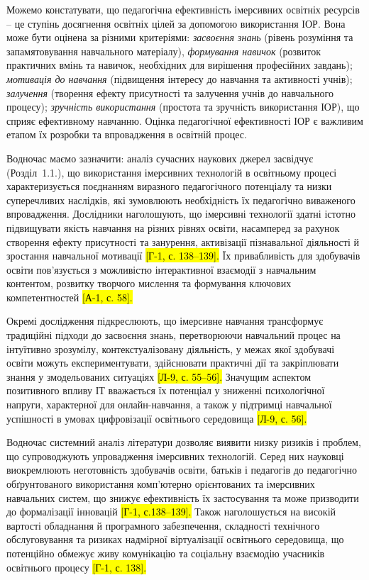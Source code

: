 Можемо констатувати, що педагогічна ефективність імерсивних освітніх ресурсів -- це ступінь досягнення освітніх цілей за допомогою використання ІОР. Вона може бути оцінена за різними критеріями: \emph{засвоєння знань} (рівень розуміння та запам\textquotesingle ятовування навчального матеріалу), \emph{формування навичок} (розвиток практичних вмінь та навичок, необхідних для вирішення професійних завдань); \emph{мотивація до навчання} (підвищення інтересу до навчання та активності учнів); \emph{залучення} (творення ефекту присутності та залучення учнів до навчального процесу); \emph{зручність використання} (простота та зручність використання ІОР), що сприяє ефективному навчанню. Оцінка педагогічної ефективності ІОР є важливим етапом їх розробки та впровадження в освітній процес.

Водночас маємо зазначити: аналіз сучасних наукових джерел засвідчує (Розділ~1.1.), що використання імерсивних технологій в освітньому процесі характеризується поєднанням виразного педагогічного потенціалу та низки суперечливих наслідків, які зумовлюють необхідність їх педагогічно виваженого впровадження. Дослідники наголошують, що імерсивні технології здатні істотно підвищувати якість навчання на різних рівнях освіти, насамперед за рахунок створення ефекту присутності та занурення, активізації пізнавальної діяльності й зростання навчальної мотивації \hl{{[}Г-1, с. 138--139{]}.} Їх привабливість для здобувачів освіти пов'язується з можливістю інтерактивної взаємодії з навчальним контентом, розвитку творчого мислення та формування ключових компетентностей \hl{{[}А-1, с. 58{]}.}

Окремі дослідження підкреслюють, що імерсивне навчання трансформує традиційні підходи до засвоєння знань, перетворюючи навчальний процес на інтуїтивно зрозумілу, контекстуалізовану діяльність, у межах якої здобувачі освіти можуть експериментувати, здійснювати практичні дії та закріплювати знання у змодельованих ситуаціях \hl{{[}Л-9, с. 55--56{]}.} Значущим аспектом позитивного впливу ІТ вважається їх потенціал у зниженні психологічної напруги, характерної для онлайн-навчання, а також у підтримці навчальної успішності в умовах цифровізації освітнього середовища \hl{{[}Л-9, с. 56{]}.}

Водночас системний аналіз літератури дозволяє виявити низку ризиків і проблем, що супроводжують упровадження імерсивних технологій. Серед них науковці виокремлюють неготовність здобувачів освіти, батьків і педагогів до педагогічно обґрунтованого використання комп'ютерно орієнтованих та імерсивних навчальних систем, що знижує ефективність їх застосування та може призводити до формалізації інновацій \hl{{[}Г-1, с.138--139{]}.} Також наголошується на високій вартості обладнання й програмного забезпечення, складності технічного обслуговування та ризиках надмірної віртуалізації освітнього середовища, що потенційно обмежує живу комунікацію та соціальну взаємодію учасників освітнього процесу \hl{{[}Г-1, с. 138{]}.}

